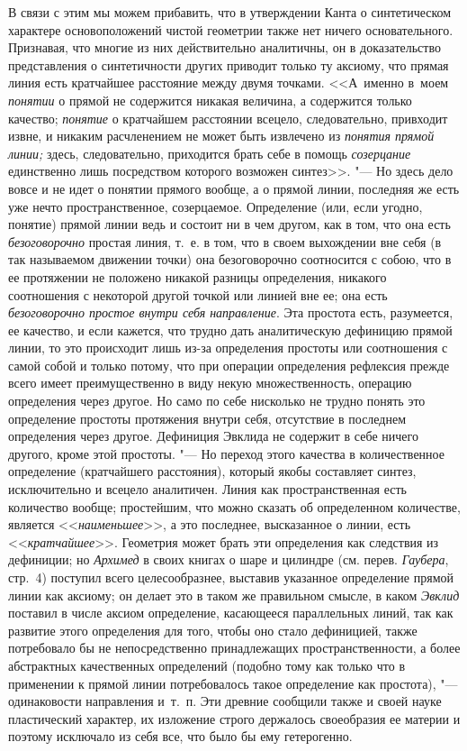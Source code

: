 В связи с этим мы можем прибавить, что в утверждении Канта о синтетическом
характере основоположений чистой геометрии также нет ничего основательного.
Признавая, что многие из них действительно аналитичны, он в доказательство
представления о синтетичности других приводит только ту аксиому, что прямая
линия есть кратчайшее расстояние между двумя точками. <<А~именно в~моем
{\em понятии} о прямой не содержится никакая величина, а содержится только
качество; {\em понятие} о кратчайшем расстоянии всецело, следовательно,
привходит извне, и никаким расчленением не может быть извлечено из
{\em понятия прямой линии;} здесь, следовательно, приходится брать себе в
помощь {\em созерцание} единственно лишь посредством которого возможен
синтез>>. "--- Но здесь дело вовсе и не идет о понятии прямого вообще, а о
прямой линии, последняя же есть уже нечто пространственное, созерцаемое.
Определение (или, если угодно, понятие) прямой линии ведь и состоит ни в чем
другом, как в том, что она есть {\em безоговорочно} простая линия, т.~е. в том,
что в своем выхождении вне себя (в так называемом движении точки) она
безоговорочно соотносится с собою, что в ее протяжении не положено никакой
разницы определения, никакого соотношения с некоторой другой точкой или линией
вне ее; она есть {\em безоговорочно простое внутри себя направление}. Эта
простота есть, разумеется, ее качество, и если кажется, что трудно дать
аналитическую дефиницию прямой линии, то это происходит лишь из-за определения
простоты или соотношения с самой собой и только потому, что при операции
определения рефлексия прежде всего имеет преимущественно в виду некую
множественность, операцию определения через другое. Но само по себе нисколько
не трудно понять это определение простоты протяжения внутри себя, отсутствие в
последнем определения через другое. Дефиниция Эвклида не содержит в себе ничего
другого, кроме этой простоты. "--- Но переход этого качества в количественное
определение (кратчайшего расстояния), который якобы составляет синтез,
исключительно и всецело аналитичен. Линия как пространственная есть количество
вообще; простейшим, что можно сказать об определенном количестве, является
<<{\em наименьшее}>>, а это последнее, высказанное о линии, есть
<<{\em кратчайшее}>>. Геометрия может брать эти определения как следствия из
дефиниции; но {\em Архимед} в своих книгах о шаре и цилиндре (см. перев.
{\em Гаубера}, стр.~4) поступил всего целесообразнее, выставив указанное
определение прямой линии как аксиому; он делает это в таком же правильном
смысле, в каком {\em Эвклид} поставил в числе аксиом определение, касающееся
параллельных линий, так как развитие этого определения для того, чтобы оно
стало дефиницией, также потребовало бы не непосредственно принадлежащих
пространственности, а более абстрактных качественных определений (подобно тому
как только что в применении к прямой линии потребовалось такое определение как
простота), "--- одинаковости направления и~т.~п. Эти древние сообщили также и
своей науке пластический характер, их изложение строго держалось своеобразия ее
материи и поэтому исключало из себя все, что было бы ему гетерогенно.

